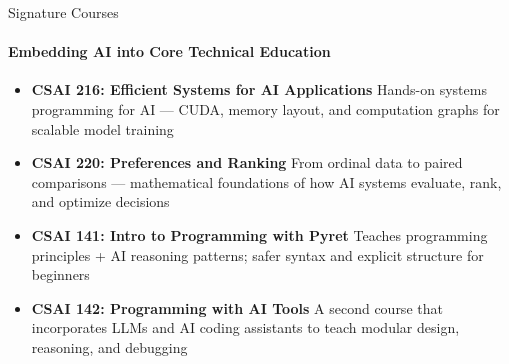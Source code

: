 \documentclass[compress]{beamer}
\begin{document}
\begin{frame}{Signature Courses}
\framesubtitle{Embedding AI into Core Technical Education}
\begin{itemize}
  \item \textbf{CSAI 216: Efficient Systems for AI Applications}  
        Hands-on systems programming for AI — CUDA, memory layout, and computation graphs for scalable model training

  \item \textbf{CSAI 220: Preferences and Ranking}  
        From ordinal data to paired comparisons — mathematical foundations of how AI systems evaluate, rank, and optimize decisions

  \item \textbf{CSAI 141: Intro to Programming with Pyret}  
        Teaches programming principles + AI reasoning patterns; safer syntax and explicit structure for beginners

  \item \textbf{CSAI 142: Programming with AI Tools}  
        A second course that incorporates LLMs and AI coding assistants to teach modular design, reasoning, and debugging
\end{itemize}
\end{frame}
\end{document}
